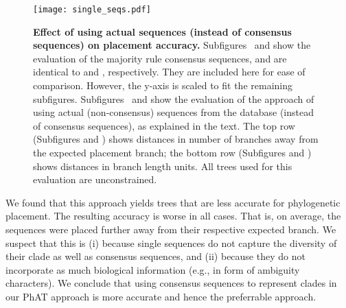 \begin{figure}[hpbt]
    \centering
    \texttt{[image: single\_seqs.pdf]}
    \begin{subfigure}{0pt}
        \label{fig:single_seqs:sub:majorities_edge}
    \end{subfigure}
    \begin{subfigure}{0pt}
        \label{fig:single_seqs:sub:single_seq_edge}
    \end{subfigure}
    \begin{subfigure}{0pt}
        \label{fig:single_seqs:sub:majorities_branch}
    \end{subfigure}
    \begin{subfigure}{0pt}
        \label{fig:single_seqs:sub:single_seq_branch}
    \end{subfigure}
    \caption[Effect of using actual sequences on placement accuracy]{
        \textbf{Effect of using actual sequences (instead of consensus sequences) on placement accuracy.}
        Subfigures~
        and 
        show the evaluation of the majority rule consensus sequences, and are identical to
         and ,
        respectively.
        They are included here for ease of comparison. 
        However, the y-axis is scaled to fit the remaining subfigures.
        Subfigures~ and 
        show the evaluation of the approach of using actual (non-consensus) sequences
        from the database (instead of consensus sequences), as explained in the text.
        The top row (Subfigures  and )
        shows distances in number of branches away from the expected placement branch;
        the bottom row (Subfigures  and )
        shows distances in branch length units.
        All trees used for this evaluation are unconstrained.
    }
    \label{fig:single_seqs}
\end{figure}

We found that this approach yields trees that are less accurate for phylogenetic placement.
The resulting accuracy is worse in all cases.
That is, on average, the sequences were placed further away from their respective expected branch.
We suspect that this is (i) because single sequences do not capture the diversity of their clade
as well as consensus sequences,
and (ii) because they do not incorporate as much biological information (e.g., in form of ambiguity characters).
We conclude that using consensus sequences to represent clades in our \ac{PhAT} approach is more accurate
and hence the preferrable approach.


